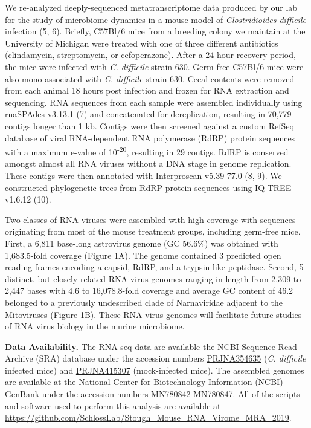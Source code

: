 \documentclass[
  11pt,
]{article}
\begin{document}
We re-analyzed deeply-sequenced metatranscriptome data produced by our
lab for the study of microbiome dynamics in a mouse model of
\emph{Clostridioides difficile} infection (5, 6). Briefly, C57Bl/6 mice
from a breeding colony we maintain at the University of Michigan were
treated with one of three different antibiotics (clindamycin,
streptomycin, or cefoperazone). After a 24 hour recovery period, the
mice were infected with \emph{C. difficile} strain 630. Germ free
C57Bl/6 mice were also mono-associated with \emph{C. difficile} strain
630. Cecal contents were removed from each animal 18 hours post
infection and frozen for RNA extraction and sequencing. RNA sequences
from each sample were assembled individually using rnaSPAdes v3.13.1 (7)
and concatenated for dereplication, resulting in 70,779 contigs longer
than 1 kb. Contigs were then screened against a custom RefSeq database
of viral RNA-dependent RNA polymerase (RdRP) protein sequences with a
maximum e-value of 10\textsuperscript{-20}, resulting in 29 contigs.
RdRP is conserved amongst almost all RNA viruses without a DNA stage in
genome replication. These contigs were then annotated with Interproscan
v5.39-77.0 (8, 9). We constructed phylogenetic trees from RdRP protein
sequences using IQ-TREE v1.6.12 (10).

Two classes of RNA viruses were assembled with high coverage with
sequences originating from most of the mouse treatment groups, including
germ-free mice. First, a 6,811 base-long astrovirus genome (GC 56.6\%)
was obtained with 1,683.5-fold coverage (Figure 1A). The genome
contained 3 predicted open reading frames encoding a capsid, RdRP, and a
trypsin-like peptidase. Second, 5 distinct, but closely related RNA
virus genomes ranging in length from 2,309 to 2,447 bases with 4.6 to
16,078.8-fold coverage and average GC content of 46.2 belonged to a
previously undescribed clade of Narnaviridae adjacent to the Mitoviruses
(Figure 1B). These RNA virus genomes will facilitate future studies of
RNA virus biology in the murine microbiome.

\textbf{Data Availability.} The RNA-seq data are available the NCBI
Sequence Read Archive (SRA) database under the accession numbers
\href{https://www.ncbi.nlm.nih.gov/bioproject/354635}{PRJNA354635}
(\emph{C. difficile} infected mice) and
\href{https://www.ncbi.nlm.nih.gov/bioproject/415307}{PRJNA415307}
(mock-infected mice). The assembled genomes are available at the
National Center for Biotechnology Information (NCBI) GenBank under the
accession numbers
\href{https://www.ncbi.nlm.nih.gov/nuccore/?term=MN780842+MN780843+MN780844+MN780845+MN780846+MN780847}{MN780842-MN780847}.
All of the scripts and software used to perform this analysis are
available at
\url{https://github.com/SchlossLab/Stough_Mouse_RNA_Virome_MRA_2019}.
\end{document}
